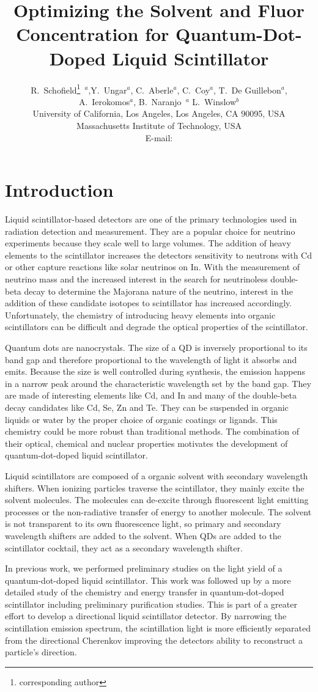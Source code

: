\documentclass{JINST}
\title{Optimizing the Solvent and Fluor Concentration for Quantum-Dot-Doped Liquid Scintillator}
\author{R.~Schofield\setcounter{footnote}{0}\thanks{corresponding author}~$^a$,Y.~Ungar$^a$, C.~Aberle$^a$, C.~Coy$^a$, T.~De Guillebon$^a$, A.~Ierokomos$^a$, B.~Naranjo~$^a$ L.~Winslow$^b$\\
\llap{$^a$}University of California, Los Angeles, Los Angeles, CA 90095, USA\\
\llap{$^b$}Massachusetts Institute of Technology, USA\\
E-mail: \email{rschofield@physics.ucla.edu}}
\begin{document}
\section{Introduction}\label{intro}
Liquid scintillator-based detectors are one of the primary technologies used in radiation detection and measurement. They are a popular choice for neutrino experiments because they scale well to large volumes. The addition of heavy elements to the scintillator increases the detectors sensitivity to neutrons with Cd or other capture reactions like solar neutrinos on In\cite{raghavan76}. With the measurement of neutrino mass and the increased interest in the search for neutrinoless double-beta decay to determine the Majorana nature of the neutrino,  interest in the addition of these candidate isotopes to scintillator has increased accordingly\cite{SNO+, KZ}. Unfortunately, the chemistry of introducing heavy elements into organic scintillators can be difficult and degrade the optical properties of the scintillator.

Quantum dots are nanocrystals. The size of a QD is inversely proportional to its band gap and therefore proportional to the wavelength of light it absorbs and emits. Because the size is well controlled during synthesis, the emission happens in a narrow peak around the characteristic wavelength set by the band gap. They are made of interesting elements like Cd, and In and many of the double-beta decay candidates like Cd, Se, Zn and Te. They can be suspended in organic liquids or water by the proper choice of organic coatings or ligands. This chemistry could be more robust than traditional methods. The combination of their optical, chemical and nuclear properties motivates the development of quantum-dot-doped liquid scintillator.

Liquid scintillators are composed of a organic solvent with secondary wavelength shifters. When ionizing particles traverse the scintillator, they mainly excite the solvent molecules. The molecules can de-excite through fluorescent light emitting processes or the non-radiative transfer of energy to another molecule. The solvent is not transparent to its own fluorescence light, so primary and secondary wavelength shifters are added to the solvent. When QDs are added to the scintillator cocktail, they act as a secondary wavelength shifter.

In previous work, we performed preliminary studies on the light yield of a quantum-dot-doped liquid scintillator\cite{qd1}. This work was followed up by a more detailed study of the chemistry and energy transfer in quantum-dot-doped scintillator including preliminary purification studies\cite{qd2}. This is part of a greater effort to develop a directional liquid scintillator detector. By narrowing the scintillation emission spectrum, the scintillation light is more efficiently separated from the directional Cherenkov improving the detectors ability to reconstruct a particle's direction\cite{direction}.
\end{document}
